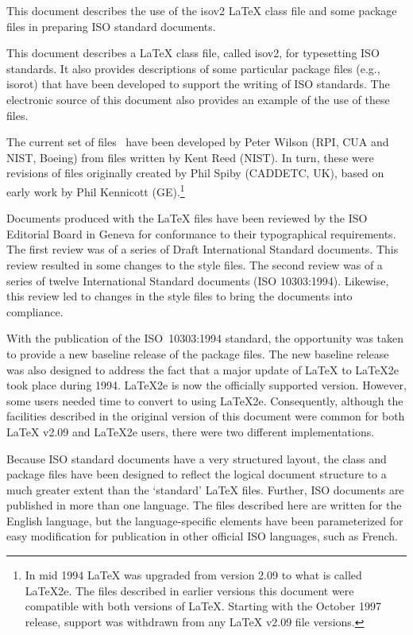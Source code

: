 \documentclass[wd,letterpaper,copyright]{isov2}
\newcommand{\latex}{LaTeX}
\newcommand{\file}[1]{\textsf{#1}}
\begin{document}
\begin{introduction}

    This document describes the use of the \file{isov2} \latex{} class 
file and some package files in preparing ISO standard documents.


    This document describes a \latex{} class file, called \file{isov2},
 for typesetting ISO standards. It also
provides descriptions of some particular package files (e.g., \file{isorot}) 
that have been developed to support the writing of ISO standards.
The electronic source of this  document also provides an example of the
use of these files.



    The current set of files~ have been developed by 
Peter Wilson (RPI, CUA and NIST, Boeing)
from files written by Kent Reed (NIST).
In turn, these were revisions of files originally created by 
Phil Spiby (CADDETC, UK), based on early work by 
Phil Kennicott (GE).\footnote{In mid 1994 \latex{} was upgraded from 
version 2.09 to what is called \latex 2e. The files described in 
earlier versions this document were compatible with both versions 
of \latex. Starting with the October 1997 release, 
support was withdrawn from any \latex{} v2.09 file versions.}


    Documents produced with the \latex{} files have been reviewed 
by the ISO Editorial Board in Geneva for conformance to their typographical
requirements. The first review was of a series of Draft International 
Standard documents. This review resulted in some changes to the style 
files. The second review was of a series of twelve International Standard 
documents (ISO 10303:1994). Likewise, this review led to changes in the 
style files to bring the documents into compliance.

    With the publication of the ISO~10303:1994 standard, the opportunity 
was taken
to provide a new baseline release of the package files.
The new baseline release was also designed to address the fact that
a major update of \latex{} to \latex 2e took place during 1994. \latex 2e
is now the officially supported version. However, some users needed time
to convert to using \latex 2e. Consequently, although the 
facilities described in the original version of this document 
were common for both 
\latex{} v2.09 and \latex 2e users, there were two different 
implementations.

    Because ISO standard documents have a very structured layout, the class
and package files have been designed to reflect the logical document structure
to a much greater extent than the `standard' \latex{} files. Further, ISO
documents are published in more than one language. The files described
here are written for the English language, but the language-specific elements
have been parameterized for easy modification for publication in other
official ISO languages, such as French.


\end{introduction}
\end{document}
